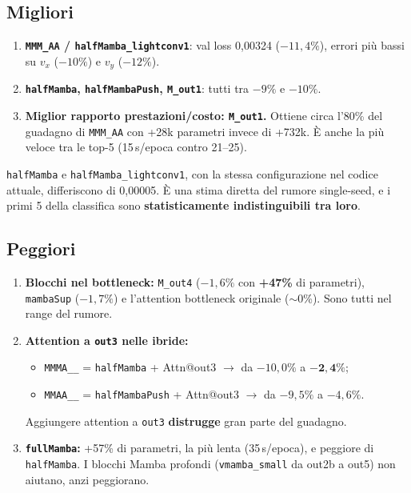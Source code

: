 \documentclass[11pt,a4paper]{article}
\newcommand{\cfg}[1]{\texttt{#1}}
\begin{document}
\subsection*{Migliori}
\begin{enumerate}
  \item \textbf{\cfg{MMM\_AA} / \cfg{halfMamba\_lightconv1}}: val loss 0,00324 ($-11{,}4\%$), errori più bassi su $v_x$ ($-10\%$) e $v_y$ ($-12\%$).
  \item \textbf{\cfg{halfMamba}, \cfg{halfMambaPush}, \cfg{M\_out1}}: tutti tra $-9\%$ e $-10\%$.
  \item \textbf{Miglior rapporto prestazioni/costo: \cfg{M\_out1}.} Ottiene circa l'80\% del guadagno di \cfg{MMM\_AA} con +28k parametri invece di +732k. È anche la più veloce tra le top-5 (15\,s/epoca contro 21--25).
\end{enumerate}

\cfg{halfMamba} e \cfg{halfMamba\_lightconv1}, con la stessa configurazione nel codice attuale, differiscono di 0,00005. È una stima diretta del rumore single-seed, e i primi 5 della classifica sono \textbf{statisticamente indistinguibili tra loro}.

\subsection*{Peggiori}
\begin{enumerate}
  \item \textbf{Blocchi nel bottleneck:} \cfg{M\_out4} ($-1{,}6\%$ con \textbf{+47\%} di parametri), \cfg{mambaSup} ($-1{,}7\%$) e l'attention bottleneck originale ($\sim$0\%). Sono tutti nel range del rumore.
  \item \textbf{Attention a \cfg{out3} nelle ibride:}
  \begin{itemize}
    \item \cfg{MMMA\_\_} = \cfg{halfMamba} + Attn@out3 $\rightarrow$ da $-10{,}0\%$ a $\mathbf{-2{,}4\%}$;
    \item \cfg{MMAA\_\_} = \cfg{halfMambaPush} + Attn@out3 $\rightarrow$ da $-9{,}5\%$ a $-4{,}6\%$.
  \end{itemize}
  Aggiungere attention a \cfg{out3} \textbf{distrugge} gran parte del guadagno.
  \item \textbf{\cfg{fullMamba}:} +57\% di parametri, la più lenta (35\,s/epoca), e peggiore di \cfg{halfMamba}. I blocchi Mamba profondi (\cfg{vmamba\_small} da out2b a out5) non aiutano, anzi peggiorano.
\end{enumerate}
\end{document}
